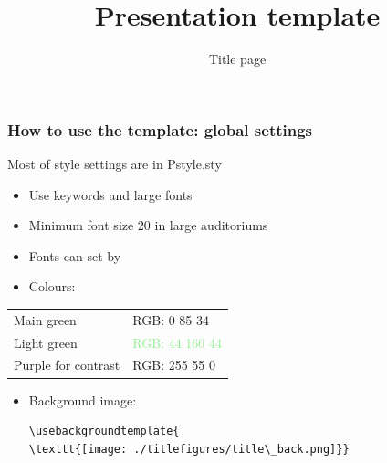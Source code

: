 \documentclass[aspectratio=169, 18pt]{beamer}
\title{Presentation template}
\subtitle{Title page}
\begin{document}
	
	
	\FirstFrame	
	\begin{frame}
	\titlepage
	\end{frame}
	
	\FrameStyleOne
	\begin{frame}[fragile]
		\frametitle{How to use the template: global settings}
		
		Most of style settings are in Pstyle.sty
		\begin{itemize}
			\item Use keywords and large fonts
			\item Minimum font size 20 in large auditoriums
			\item Fonts can set by \texttt{\setmainfont{fontname}}
			\item Colours:
		\end{itemize}
			
			\centering
			\begin{tabular}{ll}
				Main green & \textcolor{maingreen}{RGB: 0 85 34} \\
				Light green & \textcolor{lightgreen}{RGB: 44 160 44} \\
				Purple for contrast & \textcolor{mypurple}{RGB: 255 55 0} \\
			\end{tabular}
			
		\begin{itemize}
			\item Background image: 
			\begin{verbatim}
\usebackgroundtemplate{
\texttt{[image: ./titlefigures/title\_back.png]}}
			\end{verbatim}
		\end{itemize}
	\end{frame}
	
\end{document}
